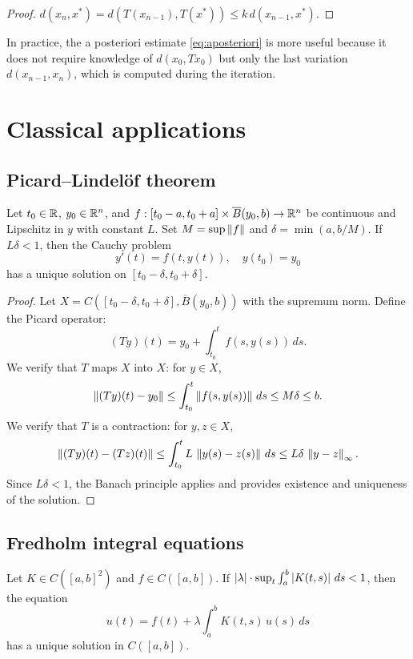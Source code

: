 \begin{proof}
$d(x_n, x^*) = d(T(x_{n-1}), T(x^*)) \leq k \, d(x_{n-1}, x^*)$.
\end{proof}

\begin{remark}
In practice, the a posteriori estimate \eqref{eq:aposteriori} is more useful
because it does not require knowledge of $d(x_0, Tx_0)$ but only the last
variation $d(x_{n-1}, x_n)$, which is computed during the iteration.
\end{remark}

\section{Classical applications}

\subsection{Picard--Lindel\"of theorem}

\begin{theorem}
Let $t_0 \in \mathbb{R}$, $y_0 \in \mathbb{R}^n$, and $f : [t_0 - a, t_0 + a] \times
\overline{B}(y_0, b) \to \mathbb{R}^n$ be continuous and Lipschitz in $y$ with constant
$L$. Set $M = \sup \left\| f \right\|$ and $\delta = \min(a, b/M)$. If $L\delta < 1$,
then the Cauchy problem
\[
    y'(t) = f(t, y(t)), \quad y(t_0) = y_0
\]
has a unique solution on $[t_0 - \delta, t_0 + \delta]$.
\end{theorem}

\begin{proof}
Let $X = C([t_0 - \delta, t_0 + \delta], \overline{B}(y_0, b))$ with the
supremum norm. Define the Picard operator:
\[
    (Ty)(t) = y_0 + \int_{t_0}^t f(s, y(s)) \, ds.
\]
We verify that $T$ maps $X$ into $X$: for $y \in X$,
\[
    \left\| (Ty)(t) - y_0 \right\| \leq \int_{t_0}^t \left\| f(s, y(s)) \right\| \, ds \leq M\delta \leq b.
\]
We verify that $T$ is a contraction: for $y, z \in X$,
\[
    \left\| (Ty)(t) - (Tz)(t) \right\| \leq \int_{t_0}^t L \, \left\| y(s) - z(s) \right\| \, ds
    \leq L\delta \, \left\| y - z \right\|_\infty.
\]
Since $L\delta < 1$, the Banach principle applies and provides existence and
uniqueness of the solution.
\end{proof}

\subsection{Fredholm integral equations}

\begin{theorem}
Let $K \in C([a,b]^2)$ and $f \in C([a,b])$. If
$\left| \lambda \right| \cdot \sup_{t} \int_a^b \left| K(t,s) \right| \, ds < 1$, then the
equation
\[
    u(t) = f(t) + \lambda \int_a^b K(t,s) \, u(s) \, ds
\]
has a unique solution in $C([a,b])$.
\end{theorem}

